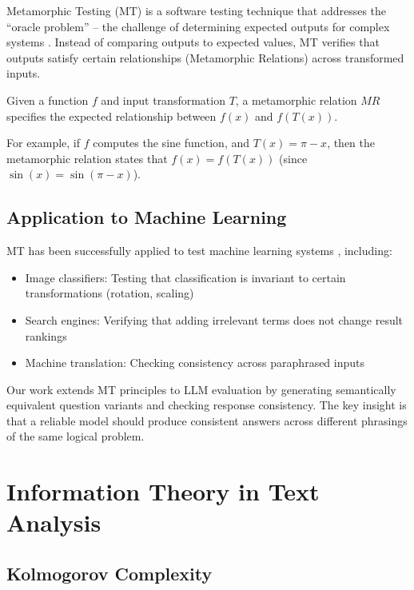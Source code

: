 Metamorphic Testing (MT) is a software testing technique that addresses the ``oracle problem'' -- the challenge of determining expected outputs for complex systems \cite{chen1998metamorphic}. Instead of comparing outputs to expected values, MT verifies that outputs satisfy certain relationships (Metamorphic Relations) across transformed inputs.

\begin{definition}
Given a function $f$ and input transformation $T$, a metamorphic relation $MR$ specifies the expected relationship between $f(x)$ and $f(T(x))$.
\end{definition}

For example, if $f$ computes the sine function, and $T(x) = \pi - x$, then the metamorphic relation states that $f(x) = f(T(x))$ (since $\sin(x) = \sin(\pi - x)$).

\subsection{Application to Machine Learning}

MT has been successfully applied to test machine learning systems \cite{xie2011testing}, including:

\begin{itemize}
    \item Image classifiers: Testing that classification is invariant to certain transformations (rotation, scaling)
    \item Search engines: Verifying that adding irrelevant terms does not change result rankings
    \item Machine translation: Checking consistency across paraphrased inputs
\end{itemize}

Our work extends MT principles to LLM evaluation by generating semantically equivalent question variants and checking response consistency. The key insight is that a reliable model should produce consistent answers across different phrasings of the same logical problem.

\section{Information Theory in Text Analysis}

\subsection{Kolmogorov Complexity}

